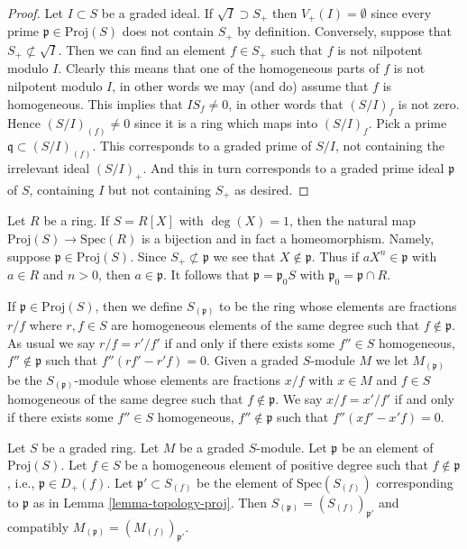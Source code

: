 \begin{proof}
\medskip\noindent
Let $I \subset S$ be a graded ideal.
If $\sqrt{I} \supset S_{+}$ then $V_{+}(I) = \emptyset$ since
every prime $\mathfrak p \in \text{Proj}(S)$ does not contain
$S_{+}$ by definition. Conversely, suppose that
$S_{+} \not \subset \sqrt{I}$. Then we can find an element
$f \in S_{+}$ such that $f$ is not nilpotent modulo $I$.
Clearly this means that one of the homogeneous parts of $f$
is not nilpotent modulo $I$, in other words we may (and do)
assume that $f$ is homogeneous. This implies that
$I S_f \not = 0$, in other words that $(S/I)_f$ is not
zero. Hence $(S/I)_{(f)} \not = 0$ since it is a ring
which maps into $(S/I)_f$. Pick a prime
$\mathfrak q \subset (S/I)_{(f)}$. This corresponds to
a graded prime of $S/I$, not containing the irrelevant ideal
$(S/I)_{+}$. And this in turn corresponds to a graded prime
ideal $\mathfrak p$ of $S$, containing $I$ but not containing $S_{+}$
as desired.
\end{proof}

\begin{example}
\label{example-proj-polynomial-ring-1-variable}
Let $R$ be a ring. If $S = R[X]$ with $\deg(X) = 1$, then the natural map
$\text{Proj}(S) \to \text{Spec}(R)$ is a bijection and in fact a homeomorphism.
Namely, suppose $\mathfrak p \in \text{Proj}(S)$. Since
$S_{+} \not \subset \mathfrak p$ we see that $X \not \in \mathfrak p$.
Thus if $aX^n \in \mathfrak p$ with $a \in R$ and $n > 0$, then
$a \in \mathfrak p$. It follows that $\mathfrak p = \mathfrak p_0S$
with $\mathfrak p_0 = \mathfrak p \cap R$.
\end{example}

\noindent
If $\mathfrak p \in \text{Proj}(S)$, then we
define $S_{(\mathfrak p)}$ to be the ring whose 
elements are fractions $r/f$ where $r, f \in S$ are homogeneous
elements of the same degree such that $f \not\in \mathfrak p$.
As usual we say $r/f = r'/f'$ if and only if there exists
some $f'' \in S$ homogeneous, $f'' \not \in \mathfrak p$ such
that $f''(rf' - r'f) = 0$.
Given a graded $S$-module $M$ we let
$M_{(\mathfrak p)}$ be the $S_{(\mathfrak p)}$-module
whose elements are fractions $x/f$ with $x \in M$
and $f \in S$ homogeneous of the same degree such that
$f \not \in \mathfrak p$. We say $x/f = x'/f'$
if and only if there exists some $f'' \in S$ homogeneous,
$f'' \not \in \mathfrak p$ such that $f''(xf' - x'f) = 0$.

\begin{lemma}
\label{lemma-proj-prime}
Let $S$ be a graded ring. Let $M$ be a graded $S$-module.
Let $\mathfrak p$ be an element of $\text{Proj}(S)$.
Let $f \in S$ be a homogeneous element of positive degree
such that $f \not \in \mathfrak p$, i.e., $\mathfrak p \in D_{+}(f)$.
Let $\mathfrak p' \subset S_{(f)}$ be the element of
$\text{Spec}(S_{(f)})$ corresponding to $\mathfrak p$ as in
Lemma \ref{lemma-topology-proj}. Then
$S_{(\mathfrak p)} = (S_{(f)})_{\mathfrak p'}$
and compatibly
$M_{(\mathfrak p)} = (M_{(f)})_{\mathfrak p'}$.
\end{lemma}

